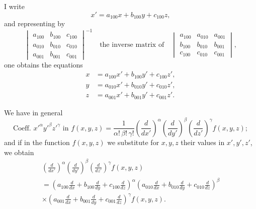 \documentclass[11pt,a4paper]{book}
\begin{document}
\setcounter{page}{55}

I write
\[
x' = a_{100}x + b_{100}y + c_{100}z,
\]
and representing by
\[
\begin{vmatrix}
a_{100} & b_{100} & c_{100} \\
a_{010} & b_{010} & c_{010} \\
a_{001} & b_{001} & c_{001}
\end{vmatrix}^{-1}
\quad\text{the inverse matrix of}\quad
\begin{vmatrix}
a_{100} & a_{010} & a_{001} \\
b_{100} & b_{010} & b_{001} \\
c_{100} & c_{010} & c_{001}
\end{vmatrix},
\]
one obtains the equations
\begin{align*}
x &= a_{100}x' + b_{100}y' + c_{100}z', \\
y &= a_{010}x' + b_{010}y' + c_{010}z', \\
z &= a_{001}x' + b_{001}y' + c_{001}z'.
\end{align*}

We have in general
\[
\text{Coeff. } x'^\alpha y'^\beta z'^\gamma \text{ in } f(x,y,z)
= \frac{1}{\alpha!\,\beta!\,\gamma!}
\left(\frac{d}{dx'}\right)^\alpha
\left(\frac{d}{dy'}\right)^\beta
\left(\frac{d}{dz'}\right)^\gamma
f(x,y,z);
\]
and if in the function $f(x,y,z)$ we substitute for $x,y,z$ their values in $x',y',z'$, we obtain
\begin{multline*}
\left(\frac{d}{dx'}\right)^\alpha
\left(\frac{d}{dy'}\right)^\beta
\left(\frac{d}{dz'}\right)^\gamma f(x,y,z) \\
= \left(a_{100}\frac{d}{dx} + b_{100}\frac{d}{dy} + c_{100}\frac{d}{dz}\right)^\alpha
\left(a_{010}\frac{d}{dx} + b_{010}\frac{d}{dy} + c_{010}\frac{d}{dz}\right)^\beta \\
\times \left(a_{001}\frac{d}{dx} + b_{001}\frac{d}{dy} + c_{001}\frac{d}{dz}\right)^\gamma f(x,y,z).
\end{multline*}

\setcounter{page}{56}
\end{document}
